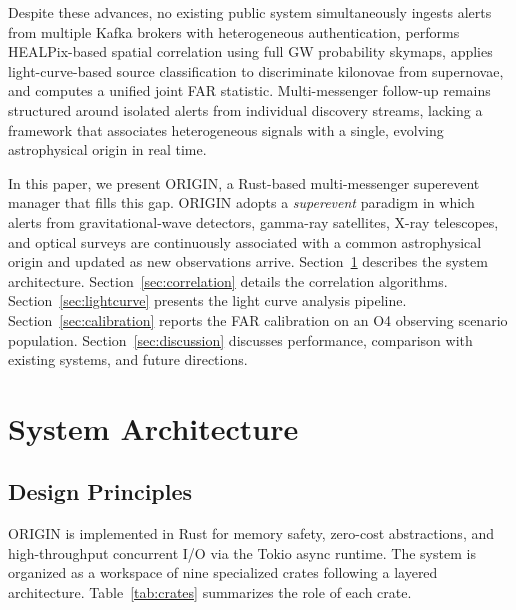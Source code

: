 \documentclass[twocolumn]{article}
\begin{document}
Despite these advances, no existing public system simultaneously ingests alerts from multiple Kafka brokers with heterogeneous authentication, performs HEALPix-based spatial correlation using full GW probability skymaps, applies light-curve-based source classification to discriminate kilonovae from supernovae, and computes a unified joint FAR statistic. Multi-messenger follow-up remains structured around isolated alerts from individual discovery streams, lacking a framework that associates heterogeneous signals with a single, evolving astrophysical origin in real time.

In this paper, we present ORIGIN, a Rust-based multi-messenger superevent manager that fills this gap. ORIGIN adopts a \textit{superevent} paradigm in which alerts from gravitational-wave detectors, gamma-ray satellites, X-ray telescopes, and optical surveys are continuously associated with a common astrophysical origin and updated as new observations arrive. Section~\ref{sec:architecture} describes the system architecture. Section~\ref{sec:correlation} details the correlation algorithms. Section~\ref{sec:lightcurve} presents the light curve analysis pipeline. Section~\ref{sec:calibration} reports the FAR calibration on an O4 observing scenario population. Section~\ref{sec:discussion} discusses performance, comparison with existing systems, and future directions.

\section{System Architecture} \label{sec:architecture}

\subsection{Design Principles} \label{sec:design}

ORIGIN is implemented in Rust for memory safety, zero-cost abstractions, and high-throughput concurrent I/O via the Tokio async runtime. The system is organized as a workspace of nine specialized crates following a layered architecture. Table~\ref{tab:crates} summarizes the role of each crate.

\end{document}
